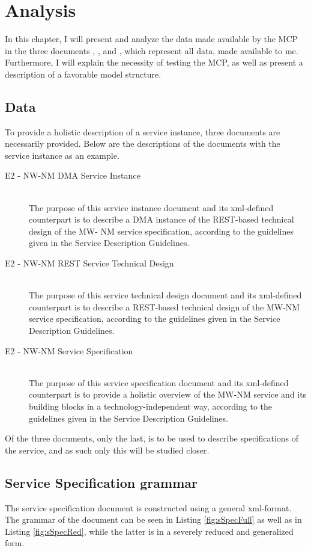 \chapter{Analysis}

In this chapter, I will present and analyze the data made available by the MCP in the three documents , , and , which represent all data, made available to me. Furthermore, I will explain the necessity of testing the MCP, as well as present a description of a favorable model structure. 

\section{Data}

To provide a holistic description of a service instance, three documents are necessarily provided. Below are the descriptions of the documents with the service instance  as an example.
\begin{description}
	\item[E2 - NW-NM DMA Service Instance]\ \\
	The purpose of this service instance document and its xml-defined counterpart is to describe a DMA instance of the REST-based technical design of the MW- NM service specification, according to the guidelines given in the Service Description Guidelines.
	\item[E2 - NW-NM REST Service Technical Design]\ \\
	The purpose of this service technical design document and its xml-defined counterpart is to describe a REST-based technical design of the MW-NM service specification, according to the guidelines given in the Service Description Guidelines.
	\item[E2 - NW-NM Service Specification]\ \\
	The purpose of this service specification document and its xml-defined counterpart is to provide a holistic overview of the MW-NM service and its building blocks in a technology-independent way, according to the guidelines given in the Service Description Guidelines.
\end{description}
Of the three documents, only the last,  is to be used to describe specifications of the service, and as such only this will be studied closer.
\section{Service Specification grammar}
The service specification document is constructed using a general xml-format. The grammar of the document can be seen in Listing \ref{fig:sSpecFull} as well as in Listing \ref{fig:sSpecRed}, while the latter is in a severely reduced and generalized form.


